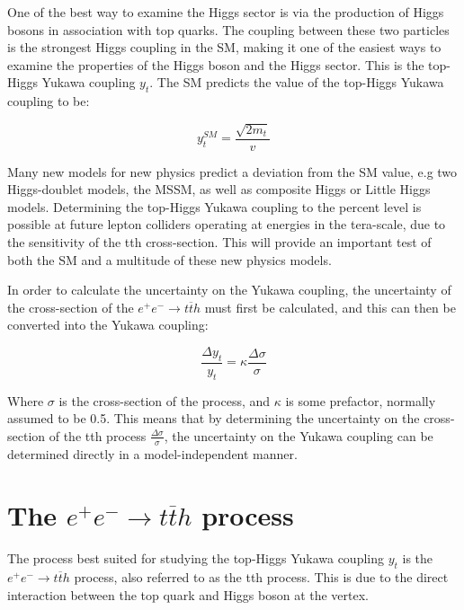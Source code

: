 One of the best way to examine the Higgs sector is via the production of Higgs bosons in association with top quarks. The coupling between these two particles is the strongest Higgs coupling in the \acrshort{SM}, making it one of the easiest ways to examine the properties of the Higgs boson and the Higgs sector. This is the top-Higgs Yukawa coupling $y_t$. The \acrfull{SM} predicts the value of the top-Higgs Yukawa coupling to be:

\begin{equation}
	y_t^{SM} = \frac{\sqrt{2m_t}}{v}
\label{eq:yukawacoupling-sm-value}
\end{equation}

Many new models for new physics predict a deviation from the \acrshort{SM} value, e.g two Higgs-doublet models, the \acrfull{MSSM}, as well as composite Higgs or Little Higgs models. Determining the top-Higgs Yukawa coupling to the percent level is possible at future lepton colliders operating at energies in the tera-scale, due to the sensitivity of the tth cross-section. This will provide an important test of both the \acrlong{SM} and a multitude of these new physics models. 

In order to calculate the uncertainty on the Yukawa coupling, the uncertainty of the cross-section of the $e^+ e^- \rightarrow t\overline{t}h$ must first be calculated, and this can then be converted into the Yukawa coupling:

\begin{equation}
	\frac{\Delta y_t}{y_t} = \kappa \frac{\Delta \sigma}{\sigma}
\label{eq:crosssection-to-yukawa}
\end{equation}

Where $\sigma$ is the cross-section of the process, and $\kappa$ is some prefactor, normally assumed to be 0.5. This means that by determining the uncertainty on the cross-section of the tth process $\frac{\Delta \sigma}{\sigma}$, the uncertainty on the Yukawa coupling can be determined directly in a model-independent manner. 

%

\section{The $e^+ e^- \rightarrow t\overline{t}h$ process}
The process best suited for studying the top-Higgs Yukawa coupling $y_t$ is the $e^+ e^- \rightarrow t\overline{t}h$ process, also referred to as the tth process. This is due to the direct interaction between the top quark and Higgs boson at the vertex.

